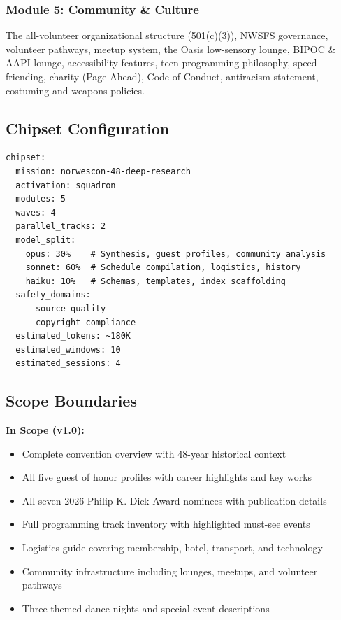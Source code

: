 \documentclass[11pt,letterpaper]{article}
\begin{document}
\subsubsection{Module 5: Community \& Culture}

The all-volunteer organizational structure (501(c)(3)), NWSFS governance, volunteer pathways, meetup system, the Oasis low-sensory lounge, BIPOC \& AAPI lounge, accessibility features, teen programming philosophy, speed friending, charity (Page Ahead), Code of Conduct, antiracism statement, costuming and weapons policies.

\subsection{Chipset Configuration}

\begin{asciibox}
\begin{verbatim}
chipset:
  mission: norwescon-48-deep-research
  activation: squadron
  modules: 5
  waves: 4
  parallel_tracks: 2
  model_split:
    opus: 30%    # Synthesis, guest profiles, community analysis
    sonnet: 60%  # Schedule compilation, logistics, history
    haiku: 10%   # Schemas, templates, index scaffolding
  safety_domains:
    - source_quality
    - copyright_compliance
  estimated_tokens: ~180K
  estimated_windows: 10
  estimated_sessions: 4
\end{verbatim}
\end{asciibox}

\subsection{Scope Boundaries}

\textbf{In Scope (v1.0):}
\begin{itemize}[leftmargin=2em]
\item Complete convention overview with 48-year historical context
\item All five guest of honor profiles with career highlights and key works
\item All seven 2026 Philip K. Dick Award nominees with publication details
\item Full programming track inventory with highlighted must-see events
\item Logistics guide covering membership, hotel, transport, and technology
\item Community infrastructure including lounges, meetups, and volunteer pathways
\item Three themed dance nights and special event descriptions
\end{itemize}
\end{document}
